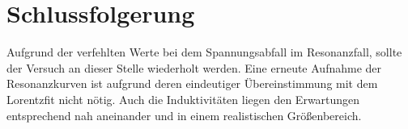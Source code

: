 \section{Schlussfolgerung}
	
	Aufgrund der verfehlten Werte bei dem Spannungsabfall im Resonanzfall, sollte der Versuch an dieser Stelle wiederholt werden. 
	Eine erneute Aufnahme der Resonanzkurven ist aufgrund deren eindeutiger Übereinstimmung mit dem Lorentzfit nicht nötig.
	Auch die Induktivitäten liegen den Erwartungen entsprechend nah aneinander und in einem realistischen Größenbereich.
	
	









